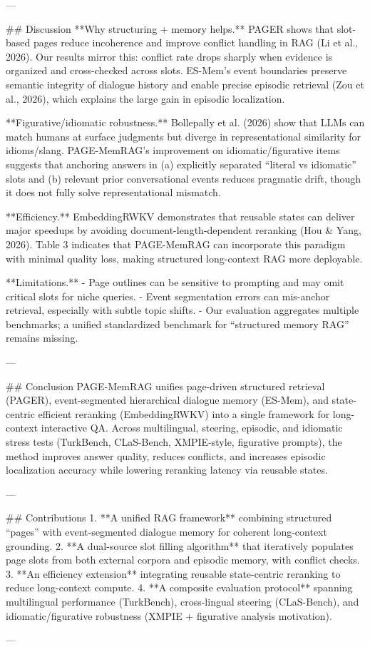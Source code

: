 ---

## Discussion  
**Why structuring + memory helps.** PAGER shows that slot-based pages reduce incoherence and improve conflict handling in RAG (Li et al., 2026). Our results mirror this: conflict rate drops sharply when evidence is organized and cross-checked across slots. ES-Mem’s event boundaries preserve semantic integrity of dialogue history and enable precise episodic retrieval (Zou et al., 2026), which explains the large gain in episodic localization.

**Figurative/idiomatic robustness.** Bollepally et al. (2026) show that LLMs can match humans at surface judgments but diverge in representational similarity for idioms/slang. PAGE-MemRAG’s improvement on idiomatic/figurative items suggests that anchoring answers in (a) explicitly separated “literal vs idiomatic” slots and (b) relevant prior conversational events reduces pragmatic drift, though it does not fully solve representational mismatch.

**Efficiency.** EmbeddingRWKV demonstrates that reusable states can deliver major speedups by avoiding document-length-dependent reranking (Hou & Yang, 2026). Table 3 indicates that PAGE-MemRAG can incorporate this paradigm with minimal quality loss, making structured long-context RAG more deployable.

**Limitations.**  
- Page outlines can be sensitive to prompting and may omit critical slots for niche queries.  
- Event segmentation errors can mis-anchor retrieval, especially with subtle topic shifts.  
- Our evaluation aggregates multiple benchmarks; a unified standardized benchmark for “structured memory RAG” remains missing.

---

## Conclusion  
PAGE-MemRAG unifies page-driven structured retrieval (PAGER), event-segmented hierarchical dialogue memory (ES-Mem), and state-centric efficient reranking (EmbeddingRWKV) into a single framework for long-context interactive QA. Across multilingual, steering, episodic, and idiomatic stress tests (TurkBench, CLaS-Bench, XMPIE-style, figurative prompts), the method improves answer quality, reduces conflicts, and increases episodic localization accuracy while lowering reranking latency via reusable states.

---

## Contributions  
1. **A unified RAG framework** combining structured “pages” with event-segmented dialogue memory for coherent long-context grounding.  
2. **A dual-source slot filling algorithm** that iteratively populates page slots from both external corpora and episodic memory, with conflict checks.  
3. **An efficiency extension** integrating reusable state-centric reranking to reduce long-context compute.  
4. **A composite evaluation protocol** spanning multilingual performance (TurkBench), cross-lingual steering (CLaS-Bench), and idiomatic/figurative robustness (XMPIE + figurative analysis motivation).

---